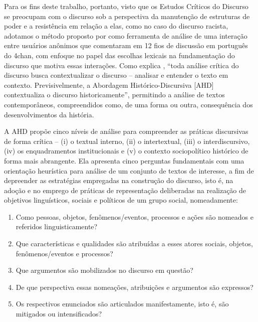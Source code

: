 \documentclass[portuguese]{textolivre}
\begin{document}
Para os fins deste trabalho, portanto, visto que os Estudos Críticos do Discurso se preocupam com o discurso sob a perspectiva da manutenção de estruturas de poder e a resistência em relação a elas, como no caso do discurso racista, adotamos o método proposto por \textcite{wodakreisigl2016} como ferramenta de análise de uma interação entre usuários anônimos que comentaram em 12 fios de discussão em português do 4chan, com enfoque no papel das escolhas lexicais na fundamentação do discurso que motiva essas interações. Como explica \textcite[p. 61, tradução nossa, colchete nosso]{richardson2017british}, “toda análise crítica do discurso busca contextualizar o discurso – analisar e entender o texto em contexto. Previsivelmente, a Abordagem Histórico-Discursiva [AHD] contextualiza o discurso historicamente”, permitindo a análise de textos contemporâneos, compreendidos como, de uma forma ou outra, consequência dos desenvolvimentos da história. 

A AHD propõe cinco níveis de análise para compreender as práticas discursivas de forma crítica – (i) o textual interno, (ii) o intertextual, (iii) o interdiscursivo, (iv) os enquadramentos institucionais e (v) o contexto sociopolítico histórico de forma mais abrangente. Ela apresenta cinco perguntas fundamentais com uma orientação heurística para análise de um conjunto de textos de interesse, a fim de depreender as estratégias empregadas na construção do discurso, isto é, na adoção e no emprego de práticas de representação deliberadas na realização de objetivos linguísticos, sociais e políticos de um grupo social, nomeadamente:

\begin{enumerate}
    \item Como pessoas, objetos, fenômenos/eventos, processos e ações são nomeados e referidos linguisticamente?
    \item Que características e qualidades são atribuídas a esses atores sociais, objetos, fenômenos/eventos e processos?
    \item Que argumentos são mobilizados no discurso em questão?
    \item De que perspectiva essas nomeações, atribuições e argumentos são expressos?
    \item Os respectivos enunciados são articulados manifestamente, isto é, são mitigados ou intensificados?
\end{enumerate}
\end{document}
